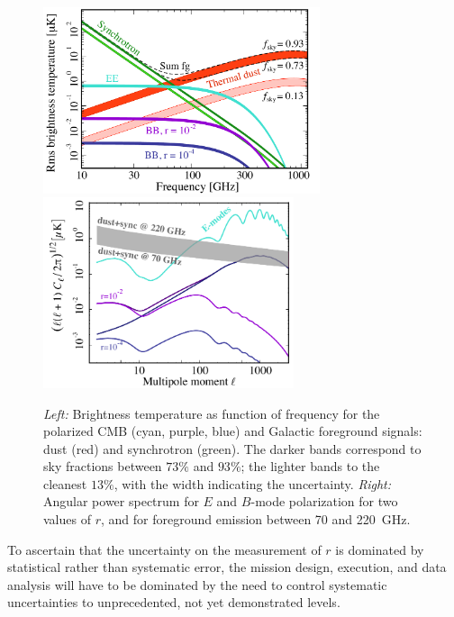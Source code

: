 \begin{figure}[ht!]
\vspace{-0.15in}
\hspace{-0.2in}
\begin{center}
\includegraphics[width=3.2in]{Figures/overview_pol_v4_fsky_noplanck.pdf}
\includegraphics[width=2.9in]{Figures/cmb_vs_foreground.pdf}
\end{center}
\vspace{-0.25in}
\caption{\small \setlength{\baselineskip}{0.95\baselineskip}
{\it Left:} Brightness temperature as function of frequency for the polarized CMB (cyan, purple, blue)
and Galactic foreground signals: dust (red) and synchrotron (green). The darker bands correspond to
sky fractions between $73\%$ and $93\%$; the lighter bands to the cleanest $13\%$, with the width 
indicating the uncertainty. {\it Right:} Angular power spectrum for $E$ and $B$-mode polarization 
for two values of $r$, and for foreground emission between 70 and 220~GHz.}
\label{fig:frequency}
\vspace{-0.05in}
\end{figure}

To ascertain that the uncertainty on the measurement of $r$ is dominated by statistical rather than 
systematic error, the mission design, execution, and data analysis will have to be dominated by the need
to control systematic uncertainties to unprecedented, not yet demonstrated levels. 

